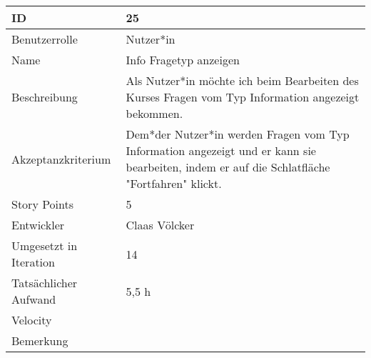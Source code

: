 \begin{tabularx}{\textwidth}{|p{}|X|}
	\hline
	ID & 25\\
	\hline
	Benutzerrolle & Nutzer*in\\
	\hline
	Name & Info Fragetyp anzeigen\\
	\hline
	Beschreibung & Als Nutzer*in möchte ich beim Bearbeiten des Kurses Fragen vom Typ Information angezeigt bekommen.\\
	\hline
	Akzeptanzkriterium & Dem*der Nutzer*in werden Fragen vom Typ Information angezeigt und er kann sie bearbeiten, indem er auf die Schlatfläche "Fortfahren" klickt.\\
	\hline
	Story Points & 5 \\
	\hline
	Entwickler & Claas Völcker \\
	\hline
	Umgesetzt in Iteration & 14\\
	\hline
	Tatsächlicher Aufwand & 5,5 h\\
	\hline
	Velocity & \\
	\hline
	Bemerkung & \\
	\hline
\end{tabularx}
\vspace{20pt}
